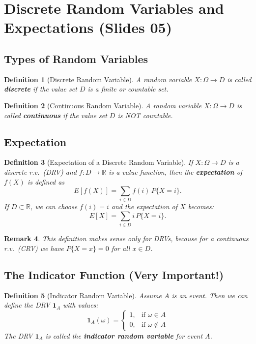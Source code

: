 \documentclass[12pt]{article}
\theoremstyle{definition_style}
\newtheorem{defn}{Definition}[section]
\newtheorem{remark}[defn]{Remark}
\begin{document}
\newpage
\section{Discrete Random Variables and Expectations (Slides 05)}

\subsection{Types of Random Variables}

\begin{defn}[Discrete Random Variable]
A random variable $X: \Omega \to D$ is called \textbf{discrete} if the value set $D$ is a finite or countable set.
\end{defn}

\begin{defn}[Continuous Random Variable]
A random variable $X: \Omega \to D$ is called \textbf{continuous} if the value set $D$ is NOT countable.
\end{defn}

\subsection{Expectation}

\begin{defn}[Expectation of a Discrete Random Variable]
If $X: \Omega \to D$ is a discrete r.v.\ (DRV) and $f: D \to \mathbb{R}$ is a value function, then the \textbf{expectation} of $f(X)$ is defined as
\[
    E[f(X)] = \sum_{i \in D} f(i) \, P\{X = i\}.
\]
If $D \subset \mathbb{R}$, we can choose $f(i) = i$ and the expectation of $X$ becomes:
\[
    E[X] = \sum_{i \in D} i \, P\{X = i\}.
\]
\end{defn}

\begin{remark}
This definition makes sense only for DRVs, because for a continuous r.v.\ (CRV) we have $P\{X = x\} = 0$ for all $x \in D$.
\end{remark}

\subsection{The Indicator Function (Very Important!)}

\begin{defn}[Indicator Random Variable]
Assume $A$ is an event. Then we can define the DRV $\mathbf{1}_A$ with values:
\[
    \mathbf{1}_A(\omega) = \begin{cases} 1, & \text{if } \omega \in A \\ 0, & \text{if } \omega \notin A \end{cases}
\]
The DRV $\mathbf{1}_A$ is called the \textbf{indicator random variable} for event $A$.
\end{defn}
\end{document}
